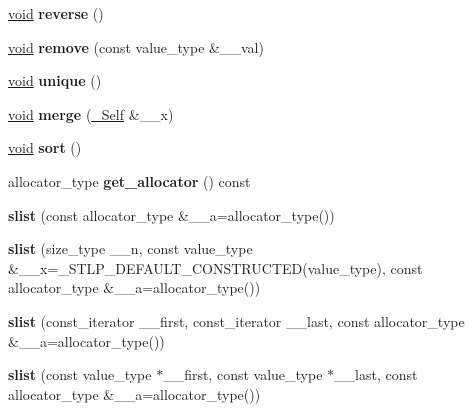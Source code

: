 \begin{DoxyCompactItemize}
\hyperlink{interfacevoid}{void} {\bfseries reverse} ()
\item 
\mbox{\label{classslist_aaf7d34720df2a72f30ff2d0540d98486}} 
\hyperlink{interfacevoid}{void} {\bfseries remove} (const value\+\_\+type \&\+\_\+\+\_\+val)
\item 
\mbox{\label{classslist_a3e848b45c90302915a7b36e7a610c3eb}} 
\hyperlink{interfacevoid}{void} {\bfseries unique} ()
\item 
\mbox{\label{classslist_a0372d5605ed4619003a7517496568b24}} 
\hyperlink{interfacevoid}{void} {\bfseries merge} (\hyperlink{classslist}{\+\_\+\+Self} \&\+\_\+\+\_\+x)
\item 
\mbox{\label{classslist_abe0261d20621ec55d9d5e5cd535296e0}} 
\hyperlink{interfacevoid}{void} {\bfseries sort} ()
\item 
\mbox{\label{classslist_a9edecdb6fd71b4873a4b7fb2b247dd8f}} 
allocator\+\_\+type {\bfseries get\+\_\+allocator} () const
\item 
\mbox{\label{classslist_ace74b47cf2c4c5d6738b944e2dcdb1e1}} 
{\bfseries slist} (const allocator\+\_\+type \&\+\_\+\+\_\+a=allocator\+\_\+type())
\item 
\mbox{\label{classslist_afd8cea1707f1da92ea606024bc4e1875}} 
{\bfseries slist} (size\+\_\+type \+\_\+\+\_\+n, const value\+\_\+type \&\+\_\+\+\_\+x=\+\_\+\+S\+T\+L\+P\+\_\+\+D\+E\+F\+A\+U\+L\+T\+\_\+\+C\+O\+N\+S\+T\+R\+U\+C\+T\+ED(value\+\_\+type), const allocator\+\_\+type \&\+\_\+\+\_\+a=allocator\+\_\+type())
\item 
\mbox{\label{classslist_a2ab679da9e4fa382b1cd521c5af4a139}} 
{\bfseries slist} (const\+\_\+iterator \+\_\+\+\_\+first, const\+\_\+iterator \+\_\+\+\_\+last, const allocator\+\_\+type \&\+\_\+\+\_\+a=allocator\+\_\+type())
\item 
\mbox{\label{classslist_a665911ec97c61284eede5fa3a73a4c54}} 
{\bfseries slist} (const value\+\_\+type $\ast$\+\_\+\+\_\+first, const value\+\_\+type $\ast$\+\_\+\+\_\+last, const allocator\+\_\+type \&\+\_\+\+\_\+a=allocator\+\_\+type())
\item 

\end{DoxyCompactItemize}
